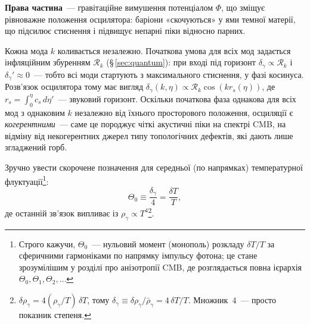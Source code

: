 \textbf{Права частина}~--- гравітаційне вимушення
потенціалом $\Phi$, що зміщує рівноважне положення
осцилятора: баріони «скочуються» у ями темної матерії,
що підсилює стиснення і підвищує непарні піки відносно
парних.

Кожна мода $k$ коливається незалежно. Початкова умова
для всіх мод задається інфляційним збуренням $\mathcal{R}_k$  (§\,\ref{sec:quantum}):
при вході під горизонт $\delta_\gamma \propto \mathcal{R}_k$
і $\delta_\gamma' \approx 0$~--- тобто всі моди стартують
з максимального стиснення, у фазі косинуса.
Розв'язок осцилятора тому має вигляд
$\delta_\gamma(k,\eta) \propto \mathcal{R}_k\cos(k r_s(\eta))$,
де $r_s = \int_0^\eta c_s\,d\eta'$~--- звуковий горизонт.
Оскільки початкова фаза однакова для всіх мод з однаковим $k$
незалежно від їхнього просторового положення, осциляції є
\emph{когерентними}~--- саме це породжує чіткі акустичні
піки на спектрі CMB, на відміну від некогерентних джерел
типу топологічних дефектів, які дають лише згладжений горб.

Зручно увести скорочене позначення для середньої
(по напрямках) температурної флуктуації\footnote{%
Строго кажучи, $\Theta_0$~--- нульовий момент (монополь)
розкладу $\delta T/T$ за сферичними гармоніками по напрямку
імпульсу фотона; це стане зрозумілішим у розділі про
анізотропії CMB, де розглядається повна ієрархія
$\Theta_0, \Theta_1, \Theta_2,\ldots$}:
\begin{equation}\label{eq:Theta0_def}
  \Theta_0 \equiv \frac{\delta_\gamma}{4} = \frac{\delta T}{T},
\end{equation}
де останній зв'язок випливає із $\rho_\gamma \propto T^4$\footnote{%
$\delta\rho_\gamma = 4(\rho_\gamma/T)\,\delta T$,
тому $\delta_\gamma \equiv \delta\rho_\gamma/\bar\rho_\gamma
= 4\,\delta T/T$.
Множник~$4$~--- просто показник степеня.}.

